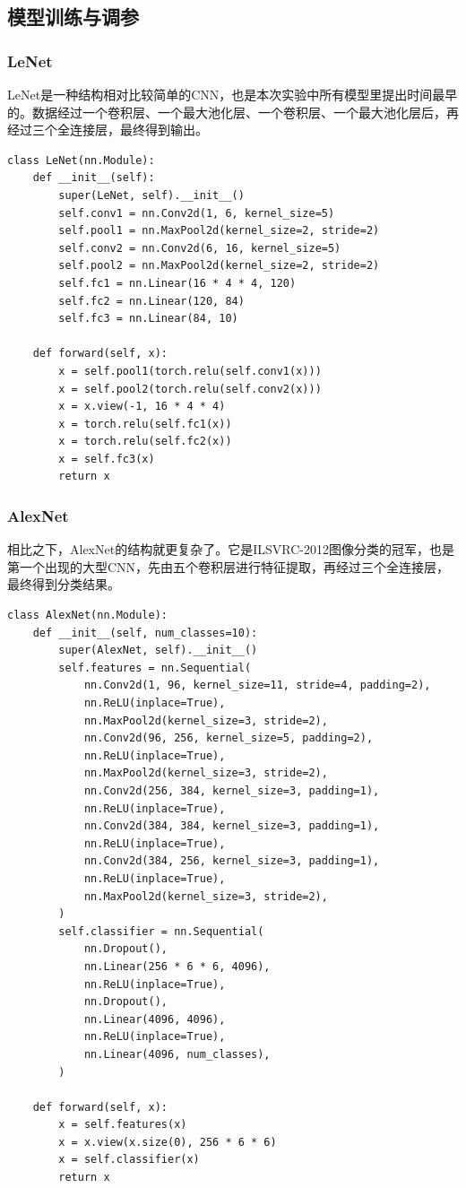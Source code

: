 \documentclass{article}
\begin{document}
\subsection{模型训练与调参}
\subsubsection{LeNet}
LeNet是一种结构相对比较简单的CNN，也是本次实验中所有模型里提出时间最早的。数据经过一个卷积层、一个最大池化层、一个卷积层、一个最大池化层后，再经过三个全连接层，最终得到输出。
\begin{lstlisting}
class LeNet(nn.Module):
    def __init__(self):
        super(LeNet, self).__init__()
        self.conv1 = nn.Conv2d(1, 6, kernel_size=5)
        self.pool1 = nn.MaxPool2d(kernel_size=2, stride=2)
        self.conv2 = nn.Conv2d(6, 16, kernel_size=5)
        self.pool2 = nn.MaxPool2d(kernel_size=2, stride=2)
        self.fc1 = nn.Linear(16 * 4 * 4, 120)
        self.fc2 = nn.Linear(120, 84)
        self.fc3 = nn.Linear(84, 10)

    def forward(self, x):
        x = self.pool1(torch.relu(self.conv1(x)))
        x = self.pool2(torch.relu(self.conv2(x)))
        x = x.view(-1, 16 * 4 * 4)
        x = torch.relu(self.fc1(x))
        x = torch.relu(self.fc2(x))
        x = self.fc3(x)
        return x
\end{lstlisting}

\subsubsection{AlexNet}
相比之下，AlexNet的结构就更复杂了。它是ILSVRC-2012图像分类的冠军，也是第一个出现的大型CNN，先由五个卷积层进行特征提取，再经过三个全连接层，最终得到分类结果。
\begin{lstlisting}
class AlexNet(nn.Module):
    def __init__(self, num_classes=10):
        super(AlexNet, self).__init__()
        self.features = nn.Sequential(
            nn.Conv2d(1, 96, kernel_size=11, stride=4, padding=2),
            nn.ReLU(inplace=True),
            nn.MaxPool2d(kernel_size=3, stride=2),
            nn.Conv2d(96, 256, kernel_size=5, padding=2),
            nn.ReLU(inplace=True),
            nn.MaxPool2d(kernel_size=3, stride=2),
            nn.Conv2d(256, 384, kernel_size=3, padding=1),
            nn.ReLU(inplace=True),
            nn.Conv2d(384, 384, kernel_size=3, padding=1),
            nn.ReLU(inplace=True),
            nn.Conv2d(384, 256, kernel_size=3, padding=1),
            nn.ReLU(inplace=True),
            nn.MaxPool2d(kernel_size=3, stride=2),
        )
        self.classifier = nn.Sequential(
            nn.Dropout(),
            nn.Linear(256 * 6 * 6, 4096),
            nn.ReLU(inplace=True),
            nn.Dropout(),
            nn.Linear(4096, 4096),
            nn.ReLU(inplace=True),
            nn.Linear(4096, num_classes),
        )

    def forward(self, x):
        x = self.features(x)
        x = x.view(x.size(0), 256 * 6 * 6)
        x = self.classifier(x)
        return x
\end{lstlisting}
\end{document}
